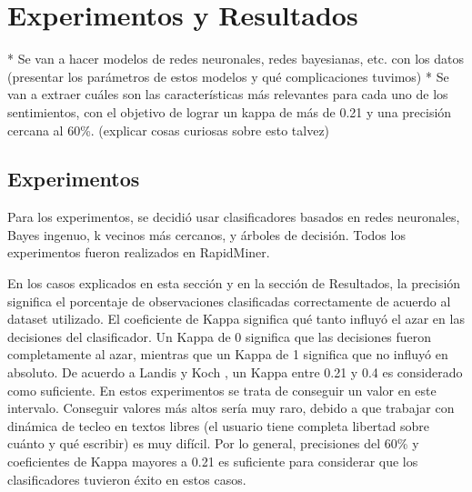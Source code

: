 
\chapter{Experimentos y Resultados}
\label{eyr}

* Se van a hacer modelos de redes neuronales, redes bayesianas,
etc. con los datos (presentar los parámetros de estos modelos y qué
complicaciones tuvimos)
* Se van a extraer cuáles son las características más relevantes para
cada uno de los sentimientos, con el objetivo de lograr un kappa de
más de 0.21 y una precisión cercana al 60\%. (explicar cosas curiosas
sobre esto talvez)

\section{Experimentos}

Para los experimentos, se decidió usar clasificadores basados en redes
neuronales, Bayes ingenuo, k vecinos más cercanos, y árboles de
decisión. Todos los experimentos fueron realizados en RapidMiner.

En los casos explicados en esta sección y en la sección de Resultados,
la precisión significa el porcentaje de observaciones clasificadas
correctamente de acuerdo al dataset utilizado. El coeficiente de Kappa
significa qué tanto influyó el azar en las decisiones del
clasificador. Un Kappa de 0 significa que las decisiones fueron
completamente al azar, mientras que un Kappa de 1 significa que no
influyó en absoluto. De acuerdo a Landis y Koch
\cite{landis1977measurement}, un Kappa entre 0.21 y 0.4 es considerado
como suficiente. En estos experimentos se trata de conseguir un valor
en este intervalo. Conseguir valores más altos sería muy raro, debido
a que trabajar con dinámica de tecleo en textos libres (el usuario
tiene completa libertad sobre cuánto y qué escribir) es muy
difícil. Por lo general, precisiones del 60\% y coeficientes de Kappa
mayores a 0.21 es suficiente para considerar que los clasificadores
tuvieron éxito en estos casos.

